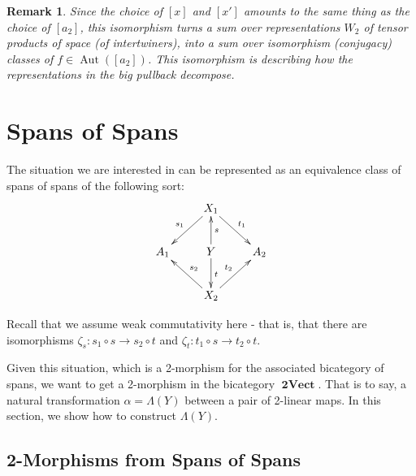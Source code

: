 \documentclass[10pt]{amsart}
\numberwithin{theorem}{subsection}
\newtheorem{varremark}[theorem]{Remark}
\newenvironment{remark}{\begin{varremark}\em}{\em\end{varremark}}
\newcommand{\ra}{\mathop{\rightarrow}}
\newcommand{\opname}[1]{\operatorname{#1}}
\newcommand{\catname}[1]{\boldsymbol{\opname{{#1}}}}
\newcommand{\iiV}{\catname{2Vect}}
\newcommand{\FV}{\Lambda}
\begin{document}
\begin{remark}
Since the choice of $[x]$ and $[x']$ amounts to the same thing as the
choice of $[a_2]$, this isomorphism turns a sum over representations
$W_2$ of tensor products of space (of intertwiners), into a sum over
isomorphism (conjugacy) classes of $f \in \opname{Aut}([a_2])$.  This
isomorphism is describing how the representations in the big pullback
decompose.
\end{remark}

\section{Spans of Spans}\label{sec:spanspan}

The situation we are interested in can be represented as an
equivalence class of spans of spans of the following sort:
\begin{equation}\label{eq:spanspan}
\xymatrix{
 & X_1 \ar[dl]_{s_1} \ar[dr]^{t_1} & \\
A_1 & Y \ar[u]_{s} \ar[d]^{t} & A_2  \\
 & X_2  \ar[ul]_{s_2} \ar[ur]^{t_2} & \\
}
\end{equation}

Recall that we assume weak commutativity here - that is, that there
are isomorphisms $\zeta_s : s_1 \circ s \ra s_2 \circ t$ and $\zeta_t :
t_1 \circ s \ra t_2 \circ t$.

Given this situation, which is a 2-morphism for the associated bicategory
of spans, we want to get a 2-morphism in the bicategory $\iiV$.  That
is to say, a natural transformation $\alpha=\FV(Y)$ between a pair of
2-linear maps.  In this section, we show how to construct $\FV(Y)$.

\subsection{2-Morphisms from Spans of Spans}
\end{document}
